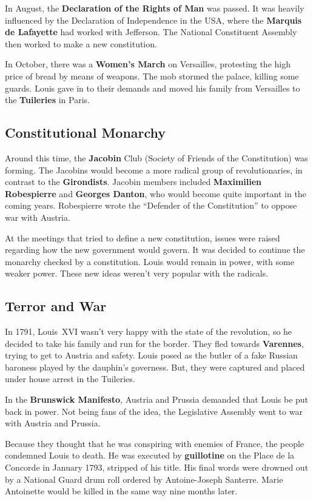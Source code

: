 In August, the \textbf{Declaration of the Rights of Man} was passed.
It was heavily influenced by the Declaration of Independence in the USA,
where the \textbf{Marquis de Lafayette} had worked with Jefferson.
The National Constituent Assembly then worked to make a new constitution.

In October, there was a \textbf{Women's March} on Versailles,
protesting the high price of bread by means of weapons.
The mob stormed the palace, killing some guards.
Louis gave in to their demands and moved his family
from Versailles to the \textbf{Tuileries} in Paris.

\subsection*{Constitutional Monarchy}

Around this time, the \textbf{Jacobin} Club (Society of Friends of the Constitution) was forming.
The Jacobins would become a more radical group of revolutionaries,
in contrast to the \textbf{Girondists}.
Jacobin members included \textbf{Maximilien Robespierre} and \textbf{Georges Danton},
who would become quite important in the coming years.
Robespierre wrote the ``Defender of the Constitution'' to oppose war with Austria.

At the meetings that tried to define a new constitution,
issues were raised regarding how the new government would govern.
It was decided to continue the monarchy checked by a constitution.
Louis would remain in power, with some weaker power.
These new ideas weren't very popular with the radicals.

\subsection*{Terror and War}

In 1791, Louis~XVI wasn't very happy with the state of the revolution,
so he decided to take his family and run for the border.
They fled towards \textbf{Varennes}, trying to get to Austria and safety.
Louis posed as the butler of a fake Russian baroness played by the dauphin's governess.
But, they were captured and placed under house arrest in the Tuileries.

In the \textbf{Brunswick Manifesto}, Austria and Prussia demanded that Louis be put back in power.
Not being fans of the idea, the Legislative Assembly went to war with Austria and Prussia.

Because they thought that he was conspiring with enemies of France,
the people condemned Louis to death.
He was executed by \textbf{guillotine} on the Place de la Concorde in January 1793,
stripped of his title.
His final words were drowned out by a National Guard drum roll ordered by Antoine-Joseph Santerre.
Marie Antoinette would be killed in the same way nine months later.

